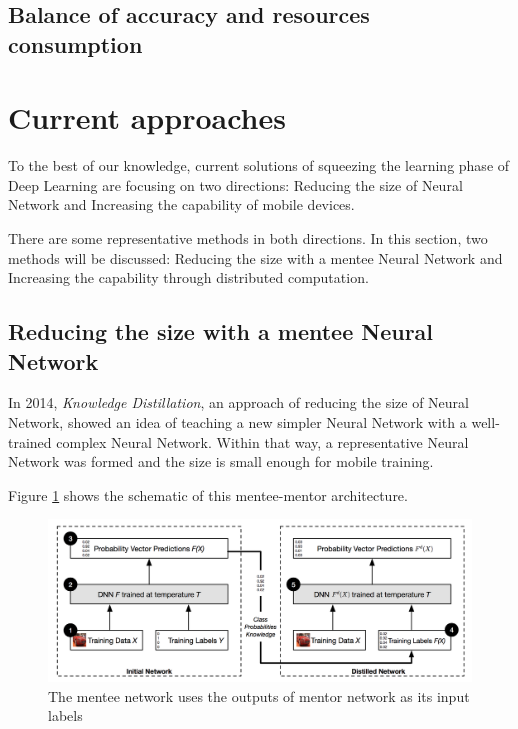 \documentclass[article]{aaltoseries}
\begin{document}
\subsection{Balance of accuracy and resources consumption}







\section{Current approaches}




To the best of our knowledge, current solutions of squeezing the learning phase of Deep Learning are focusing on two directions:
Reducing the size of Neural Network and Increasing the capability of mobile devices.

There are some representative methods in both directions. 
In this section, two methods will be discussed:
Reducing the size with a mentee Neural Network and Increasing the capability through distributed computation.


\subsection{Reducing the size with a mentee Neural Network}

In 2014, \emph{Knowledge Distillation}, an approach of reducing the size of Neural Network, 
showed an idea of teaching a new simpler Neural Network with a well-trained complex Neural Network.
Within that way, a representative Neural Network was formed and the size is small enough for mobile training.

Figure \ref{fig:mentor_pic}\cite{Distillation:2015} shows the schematic of this mentee-mentor architecture. 

\begin{figure}[t!]
  \begin{center}
    \includegraphics[width=1\textwidth]{figures/mentor_mentee}
    \caption{The mentee network uses the outputs of mentor network as its input labels}
    \label{fig:mentor_pic}
  \end{center}
\end{figure}
\end{document}
